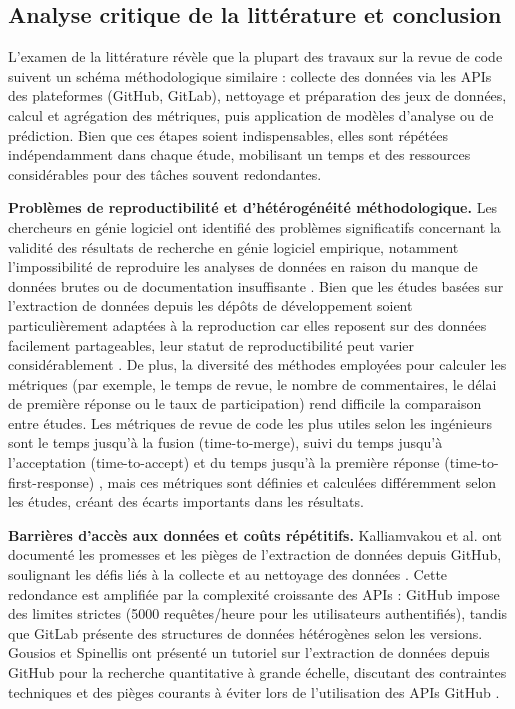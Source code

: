 \subsection{Analyse critique de la littérature et conclusion}

L'examen de la littérature révèle que la plupart des travaux sur la revue de code suivent un schéma méthodologique similaire : collecte des données via les APIs des plateformes (GitHub, GitLab), nettoyage et préparation des jeux de données, calcul et agrégation des métriques, puis application de modèles d'analyse ou de prédiction. Bien que ces étapes soient indispensables, elles sont répétées indépendamment dans chaque étude, mobilisant un temps et des ressources considérables pour des tâches souvent redondantes.

\textbf{Problèmes de reproductibilité et d'hétérogénéité méthodologique.} Les chercheurs en génie logiciel ont identifié des problèmes significatifs concernant la validité des résultats de recherche en génie logiciel empirique, notamment l'impossibilité de reproduire les analyses de données en raison du manque de données brutes ou de documentation insuffisante \cite{madeyski2017wider}. Bien que les études basées sur l'extraction de données depuis les dépôts de développement soient particulièrement adaptées à la reproduction car elles reposent sur des données facilement partageables, leur statut de reproductibilité peut varier considérablement \cite{gonzalez2012reproducibility}. De plus, la diversité des méthodes employées pour calculer les métriques (par exemple, le temps de revue, le nombre de commentaires, le délai de première réponse ou le taux de participation) rend difficile la comparaison entre études. Les métriques de revue de code les plus utiles selon les ingénieurs sont le temps jusqu'à la fusion (time-to-merge), suivi du temps jusqu'à l'acceptation (time-to-accept) et du temps jusqu'à la première réponse (time-to-first-response) \cite{sadowski2018modern}, mais ces métriques sont définies et calculées différemment selon les études, créant des écarts importants dans les résultats.

\textbf{Barrières d'accès aux données et coûts répétitifs.} Kalliamvakou et al. ont documenté les promesses et les pièges de l'extraction de données depuis GitHub, soulignant les défis liés à la collecte et au nettoyage des données \cite{kalliamvakou2014promises}. Cette redondance est amplifiée par la complexité croissante des APIs : GitHub impose des limites strictes (5000 requêtes/heure pour les utilisateurs authentifiés), tandis que GitLab présente des structures de données hétérogènes selon les versions. Gousios et Spinellis ont présenté un tutoriel sur l'extraction de données depuis GitHub pour la recherche quantitative à grande échelle, discutant des contraintes techniques et des pièges courants à éviter lors de l'utilisation des APIs GitHub \cite{gousios2017mining}.

